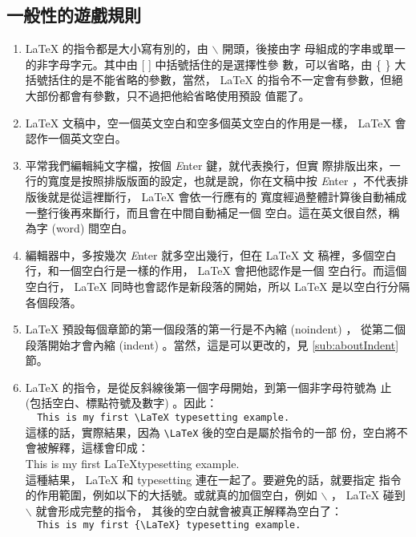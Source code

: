 \documentclass[12pt, a4paper]{report}
\begin{document}
    \subsection{一般性的遊戲規則}
      \begin{enumerate}
        \item LaTeX 的指令都是大小寫有別的，由 $\backslash$ 開頭，後接由字
          母組成的字串或單一的非字母字元。其中由 [ ] 中括號括住的是選擇性參
          數，可以省略，由 \{ \} 大括號括住的是不能省略的參數，當然， LaTeX 
          的指令不一定會有參數，但絕大部份都會有參數，只不過把他給省略使用預設
          值罷了。
        \item LaTeX 文稿中，空一個英文空白和空多個英文空白的作用是一樣，
          LaTeX 會認作一個英文空白。
        \item 平常我們編輯純文字檔，按個 {\emph Enter} 鍵，就代表換行，但實
          際排版出來，一行的寬度是按照排版版面的設定，也就是說，你在文稿中按
          {\emph Enter} ，不代表排版後就是從這裡斷行， LaTeX 會依一行應有的
          寬度經過整體計算後自動補成一整行後再來斷行，而且會在中間自動補足一個
          空白。這在英文很自然，稱為字 (word) 間空白。
        \item 編輯器中，多按幾次 {\emph Enter} 就多空出幾行，但在 LaTeX 文
          稿裡，多個空白行，和一個空白行是一樣的作用， LaTeX 會把他認作是一個
          空白行。而這個空白行， LaTeX 同時也會認作是新段落的開始，所以 
          LaTeX 是以空白行分隔各個段落。
        \item LaTeX 預設每個章節的第一個段落的第一行是不內縮 (noindent) ，
          從第二個段落開始才會內縮 (indent) 。當然，這是可以更改的，見 
          \ref{sub:aboutIndent} 節。
        \item LaTeX 的指令，是從反斜線後第一個字母開始，到第一個非字母符號為
          止 (包括空白、標點符號及數字) 。因此：\\
            \verb+  This is my first \LaTeX typesetting example.+\\
          這樣的話，實際結果，因為 \verb+\LaTeX+ 後的空白是屬於指令的一部
            份，空白將不會被解釋，這樣會印成：\\
            This is my first \LaTeX typesetting example. \\
          這種結果， LaTeX 和 typesetting 連在一起了。要避免的話，就要指定
            指令的作用範圍，例如以下的大括號。或就真的加個空白，例如 
            $\backslash$ ， LaTeX 碰到 $\backslash$ 就會形成完整的指令，
            其後的空白就會被真正解釋為空白了： \\
            \verb+  This is my first {\LaTeX} typesetting example.+ 

\end{enumerate}
\end{document}
